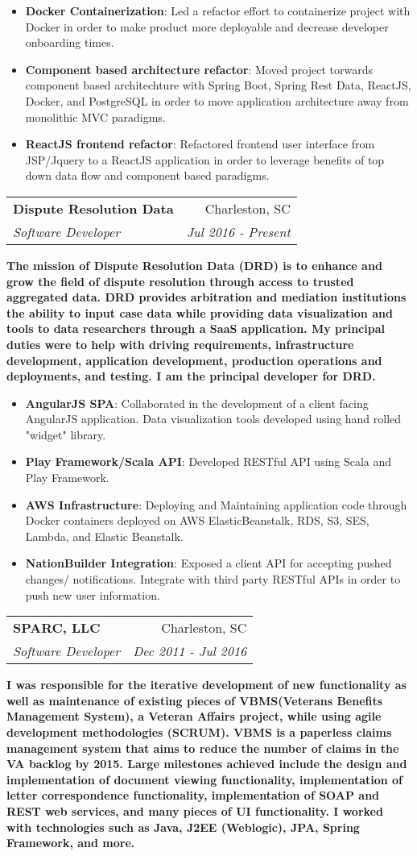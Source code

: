 \documentclass[letterpaper,11pt]{article}
\makeatletter
\newcommand{\resumeItem}[2]{
  \item\small{
    \textbf{#1}{: #2 \vspace{-2pt}}
  }
}
\newcommand{\resumeSubheading}[4]{
  \vspace{-1pt}\item
    \begin{tabular*}{0.97\textwidth}{l@{\extracolsep{\fill}}r}
      \textbf{#1} & #2 \\
      \textit{\small#3} & \textit{\small #4} \\
    \end{tabular*}\vspace{-5pt}
}
\newcommand{\resumeItemListStart}{\begin{itemize}}
\newcommand{\resumeItemListEnd}{\end{itemize}\vspace{-5pt}}
\makeatother
\begin{document}
      \resumeItemListStart
        \resumeItem{Docker Containerization}
          {Led a refactor effort to containerize project with Docker in order to make product more deployable and decrease developer onboarding times.}
        \resumeItem{Component based architecture refactor}
          {Moved project torwards component based architechture with Spring Boot, Spring Rest Data, ReactJS, Docker, and PostgreSQL in order to move application architecture away from monolithic MVC paradigms.}
        \resumeItem{ReactJS frontend refactor}
          {Refactored frontend user interface from JSP/Jquery to a ReactJS application in order to leverage benefits of top down data flow and component based paradigms.}

      \resumeItemListEnd

    \resumeSubheading
      {Dispute Resolution Data}{Charleston, SC}
      {Software Developer}{Jul 2016 - Present}



      \textbf{\normalfont The mission of Dispute Resolution Data (DRD) is to enhance and grow the field of dispute resolution through access to trusted aggregated data. DRD provides arbitration and mediation institutions the ability to input case data while providing data visualization and tools to data researchers through a SaaS application. My principal duties were to help with driving requirements, infrastructure development, application development, production operations and deployments, and testing. I am the principal developer for DRD.}

      \resumeItemListStart
        \resumeItem{AngularJS SPA}
          {Collaborated in the development of a client facing AngularJS application. Data visualization tools developed using hand rolled "widget" library.}
        \resumeItem{Play Framework/Scala API}
          {Developed RESTful API using Scala and Play Framework. }
        \resumeItem{AWS Infrastructure}
          {Deploying and Maintaining application code through Docker containers deployed on AWS ElasticBeanstalk, RDS, S3, SES, Lambda, and Elastic Beanstalk.}
        \resumeItem{NationBuilder Integration}
          {Exposed a client API for accepting pushed changes/ notifications. Integrate with third party RESTful APIs in order to push new user information.}
      \resumeItemListEnd

    \resumeSubheading
      {SPARC, LLC}{Charleston, SC}
      {Software Developer}{Dec 2011 - Jul 2016}



      \textbf{\normalfont I was responsible for the iterative development of new functionality as well as maintenance of existing pieces of VBMS(Veterans Benefits Management System), a Veteran Affairs project, while using agile development methodologies (SCRUM). VBMS is a paperless claims management system that aims to reduce the number of claims in the VA backlog by 2015. Large milestones achieved include the design and implementation of document viewing functionality, implementation of letter correspondence functionality, implementation of SOAP and REST web services, and many pieces of UI functionality. I worked with technologies such as Java, J2EE (Weblogic), JPA, Spring Framework, and more.}
\end{document}
